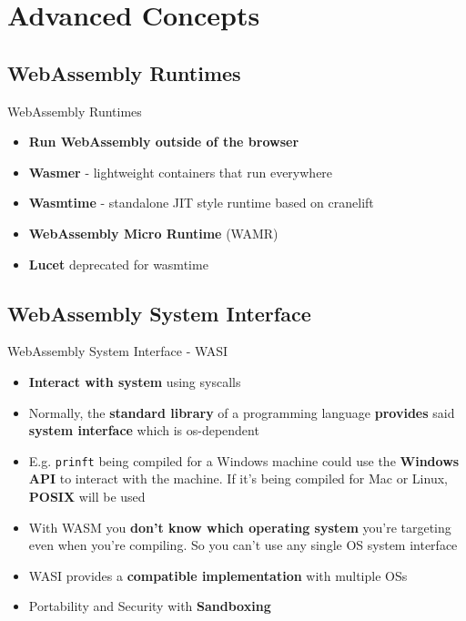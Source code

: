 \documentclass{beamer}
\begin{document}
\section{Advanced Concepts}

\subsection{WebAssembly Runtimes}

\begin{frame}{WebAssembly Runtimes}
    \begin{itemize}
        \item \textbf{Run WebAssembly outside of the browser}
        \item \textbf{Wasmer} - lightweight containers that run everywhere
        \item \textbf{Wasmtime} - standalone JIT style runtime based on cranelift
        \item \textbf{WebAssembly Micro Runtime} (WAMR) 
        \item \textbf{Lucet} deprecated for wasmtime
    \end{itemize}
\end{frame}

\subsection{WebAssembly System Interface}

\begin{frame}{WebAssembly System Interface - WASI}
\begin{itemize} 
    \item \textbf{Interact with system} using syscalls
    \item Normally, the \textbf{standard library} of a programming language \textbf{provides} said \textbf{system interface} which is os-dependent
    \item E.g. \lstinline{prinft} being compiled for a Windows machine could use the \textbf{Windows API} to interact with the machine. If it's being compiled for Mac or Linux, \textbf{POSIX} will be used
    \item With WASM you \textbf{don't know which operating system} you're targeting even when you're compiling. So you can't use any single OS system interface 
    \item WASI provides a \textbf{compatible implementation} with multiple OSs
    \item Portability and Security with \textbf{Sandboxing}
\end{itemize}
\end{frame}
\end{document}
